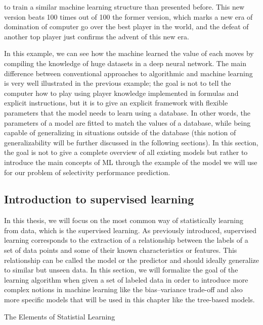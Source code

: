 \documentclass[main]{subfiles}
\begin{document}
to train a similar machine learning structure than presented before. This new version beats 100 times out of 100 the former version,\autocite{Silver_2017} which marks a new era of domination of computer go over the best player in the world, and the defeat of another top player just confirms the advent of this new era. 

In this example, we can see how the machine learned the value of each moves by compiling the knowledge of huge datasets in a deep neural network. The main difference between conventional approaches to algorithmic and machine learning is very well illustrated in the previous example; the goal is not to tell the computer how to play using player knowledge implemented in formulas and explicit instructions, but it is to give an explicit framework with flexible parameters that the model needs to learn using a database. In other words, the parameters of a model are fitted to match the values of a database, while being capable of generalizing in situations outside of the database (this notion of generalizability will be further discussed in the following sections). In this section, the goal is not to give a complete overview of all existing models but rather to introduce the main concepts of ML through the example of the model we will use for our problem of selectivity performance prediction.

\subsection{Introduction to supervised learning}

In this thesis, we will focus on the most common way of statistically learning from data, which is the supervised learning. As previously introduced, supervised learning corresponds to the extraction of a relationship between the labels of a set of data points and some of their known characteristics or features. This relationship can be called the model or the predictor and should ideally generalize to similar but unseen data. In this section, we will formalize the goal of the learning algorithm when given a set of labeled data in order to introduce more complex notions in machine learning like the bias--variance trade-off and also more specific models that will be used in this chapter like the tree-based models.


The Elements of Statistial Learning\autocite{Hastie_2009}
\end{document}
